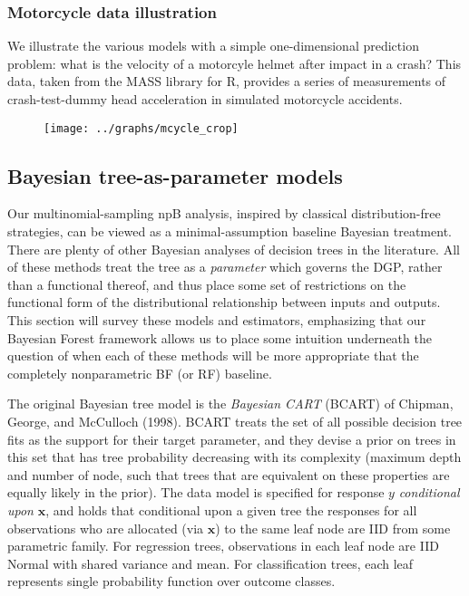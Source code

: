 \documentclass[12pt]{article}
\begin{document}
    \subsubsection{Motorcycle data
illustration}\label{motorcycle-data-illustration}

We illustrate the various models with a simple one-dimensional
prediction problem: what is the velocity of a motorcyle helmet after
impact in a crash? This data, taken from the MASS library for R,
provides a series of measurements of crash-test-dummy head acceleration
in simulated motorcycle accidents.

\begin{figure}
\texttt{[image: ../graphs/mcycle\_crop]}    
\end{figure}    

    \subsection{Bayesian tree-as-parameter
models}\label{bayesian-tree-as-parameter-models}

Our multinomial-sampling npB analysis, inspired by classical
distribution-free strategies, can be viewed as a minimal-assumption
baseline Bayesian treatment. There are plenty of other Bayesian analyses
of decision trees in the literature. All of these methods treat the tree
as a \emph{parameter} which governs the DGP, rather than a functional
thereof, and thus place some set of restrictions on the functional form
of the distributional relationship between inputs and outputs. This
section will survey these models and estimators, emphasizing that our
Bayesian Forest framework allows us to place some intuition underneath
the question of when each of these methods will be more appropriate that
the completely nonparametric BF (or RF) baseline.

The original Bayesian tree model is the \emph{Bayesian CART} (BCART) of
Chipman, George, and McCulloch (1998). BCART treats the set of all
possible decision tree fits as the support for their target parameter,
and they devise a prior on trees in this set that has tree probability
decreasing with its complexity (maximum depth and number of node, such
that trees that are equivalent on these properties are equally likely in
the prior). The data model is specified for response $y$
\emph{conditional upon} $\mathbf{x}$, and holds that conditional upon a
given tree the responses for all observations who are allocated (via
$\mathbf{x}$) to the same leaf node are IID from some parametric family.
For regression trees, observations in each leaf node are IID Normal with
shared variance and mean. For classification trees, each leaf represents
single probability function over outcome classes.
\end{document}

